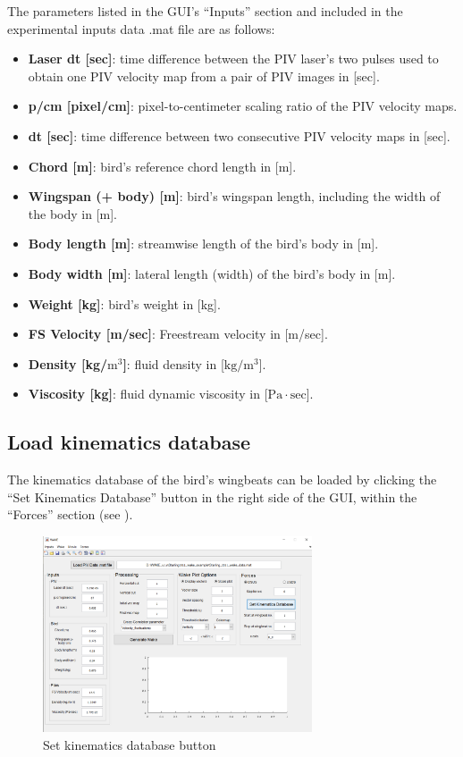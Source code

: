 \documentclass[12pt,a4paper]{article}
\begin{document}
\newpage
The parameters listed in the GUI's ``Inputs'' section and included in the experimental inputs data .mat file are as follows:
\begin{itemize}
	\item \textbf{Laser dt [sec]}: time difference between the PIV laser's two pulses used to obtain one PIV velocity map from a pair of PIV images in [sec]. 
	\item \textbf{p/cm [pixel/cm]}: pixel-to-centimeter scaling ratio of the PIV velocity maps.
	\item \textbf{dt [sec]}: time difference between two consecutive PIV velocity maps in [sec].
	\item \textbf{Chord [m]}: bird's reference chord length in [m].
	\item \textbf{Wingspan (+ body) [m]}: bird's wingspan length, including the width of the body in [m].
	\item \textbf{Body length [m]}: streamwise length of the bird's body in [m].
	\item \textbf{Body width [m]}: lateral length (width) of the bird's body in [m].
	\item \textbf{Weight [kg]}: bird's weight in [kg].
	\item \textbf{FS Velocity [m/sec]}: Freestream velocity in [m/sec].
	\item \textbf{Density [kg/$\mathrm{m^3}$]}: fluid density in [$\mathrm{kg/m^3}$].
	\item \textbf{Viscosity [kg]}: fluid dynamic viscosity in [$\mathrm{Pa\cdot sec}$].
\end{itemize}


\subsection{Load kinematics database}\label{KIN-DB}

The kinematics database of the bird's wingbeats can be loaded by clicking the ``Set Kinematics Database'' button in the right side of the GUI, within the ``Forces'' section (see ). 

\begin{figure}[ht!]
	\centering
	\includegraphics[width=0.71\textwidth]{set-kinematics-database}
	\caption{Set kinematics database button}
	\label{fig:GUI-set-kinematics-database}
\end{figure}
\end{document}
